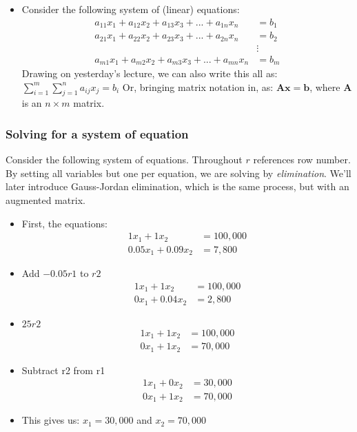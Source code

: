 \begin{itemize}
    \item Consider the following system of (linear) equations:
    \begin{align*}
        a_{11}x_1 + a_{12}x_2 + a_{13}x_3 + ... + a_{1n}x_n & = b_1 \\
        a_{21}x_1 + a_{22}x_2 + a_{23}x_3 + ... + a_{2n}x_n & = b_2 \\
        & \vdots \\
        a_{m1}x_1 + a_{m2}x_2 + a_{m3}x_3 + ... + a_{mn}x_n & = b_m 
    \end{align*}
    Drawing on yesterday's lecture, we can also write this all as: $\sum\limits_{i = 1}^m\sum\limits_{j = 1}^n a_{ij}x_j = b_i$ Or, bringing matrix notation in, as: $\bm{A}\bm{x} = \bm{b}$, where $\bm{A}$ is an $n \times m$ matrix.
\end{itemize}

\subsubsection{Solving for a system of equation}

Consider the following system of equations. Throughout $r$ references row number. By setting all variables but one per equation, we are solving by \emph{elimination}. We'll later introduce Gauss-Jordan elimination, which is the same process, but with an augmented matrix.

\begin{itemize}
    \item First, the equations:
    \begin{align*}
        1x_1 + 1x_2 & = 100,000 \\
        0.05x_1 + 0.09x_2 & = 7,800        
    \end{align*}
    \item Add $-0.05r1$ to $r2$
    \begin{align*}
        1x_1 + 1x_2 & = 100,000 \\
        0x_1 + 0.04x_2 & = 2,800        
    \end{align*}
    \item $25r2$
    \begin{align*}
        1x_1 + 1x_2 & = 100,000 \\
        0x_1 + 1x_2 & = 70,000        
    \end{align*}
    \item Subtract r2 from r1 
    \begin{align*}
        1x_1 + 0x_2 & = 30,000 \\
        0x_1 + 1x_2 & = 70,000
    \end{align*}
    \item This gives us: $x_1 = 30,000$ and $x_2 = 70,000$
\end{itemize}

